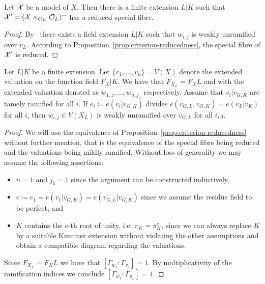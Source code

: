 \begin{theorem}
    Let $\mathcal X$ be a model of $X$.
    Then there is a finite extension $L|K$ such that $\mathcal X' = (\mathcal X \times_{\mathcal O_K}\mathcal O_L)^\sim$ has a reduced special fibre.
\end{theorem}

\begin{proof}
    By~\cite[Theorem 1.0]{Epp} there exists a field extension $L|K$ such that $w_{i,j}$ is weakly unramified over $v_L$.
    According to Proposition~\ref{prop:criterion-reducedness}, the special fibre of $\mathcal X'$ is reduced.
\end{proof}

\begin{lemma}[Abhyanka]\label{lem:abhyanka}
    Let $L|K$ be a finite extension.
    Let $\lbrace v_1, \dots, v_n \rbrace = V(X)$ denote the extended valuation on the function field $F_X|K$.
    We have that $F_{X_L} = F_X L$ and with the extended valuation denoted as $w_{1,1}, \dots, w_{n, j_n}$ respectively.
    Assume that $v_i|v_{{\scriptscriptstyle G}, K}$ are tamely ramified for all $i$.
    If $e_i \coloneqq e(v_i|v_{{\scriptscriptstyle G},K})$ divides
    $e(v_{{\scriptscriptstyle G}, L}, v_{{\scriptscriptstyle G}, K}) = e(v_L|v_K)$ for all $i$, then $w_{i,j} \in V(X_L)$
    is weakly unramified over $v_{{\scriptscriptstyle G}, L}$ for all $i,j$.
\end{lemma}

\begin{proof}
    We will use the equivalence of Proposition~\ref{prop:criterion-reducedness} without further mention,
    that is the equivalence of the special fibre being reduced and the valuations being mildly ramified.
    Without loss of generality we may assume the following assertions:
    \begin{itemize}
        \item $n = 1$ and $j_1 = 1$ since the argument can be constructed inductively,
        \item $e \coloneqq e_1 = e(v_1|v_{{\scriptscriptstyle G},K}) = e(v_{{\scriptscriptstyle G},L}|v_{{\scriptscriptstyle G},K})$
            since we assume the residue field to be perfect, and
        \item $K$ contains the $e$-th root of unity, i.e. $\pi_K = \pi_K^e$, since we can always replace $K$ by a suitable
            Kummer extension without violating the other assumptions and obtain a compatible diagram regarding the valuations.
    \end{itemize}
    Since $F_{X_L} = F_X L$ we have that $[\Gamma_{w_1}: \Gamma_{v_1}] = 1$.
    By multiplicativity of the ramification indices we conclude $[\Gamma_{w_1}: \Gamma_{v_L}] = 1$.
\end{proof}

